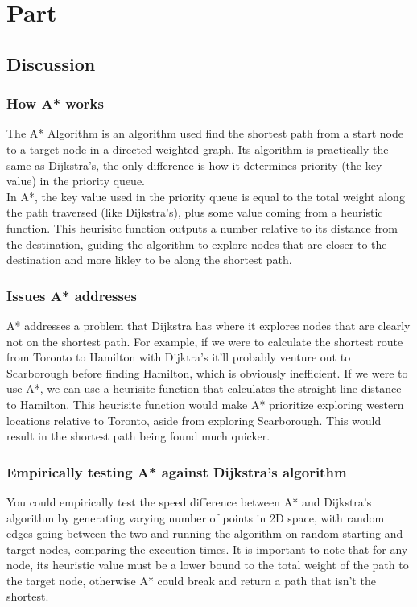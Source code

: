 \documentclass[letterpaper]{article}
\theoremstyle{plain}
\theoremstyle{definition}
\theoremstyle{remark}
\begin{document}
\section*{Part \thesection}

\subsection*{Discussion}

\subsubsection*{How A* works}
The A* Algorithm is an algorithm used find the shortest path from a start node to a target node in a directed weighted graph. Its algorithm is practically the same as Dijkstra's, the only difference is how it determines priority (the key value) in the priority queue.
\\

In A*, the key value used in the priority queue is equal to the total weight along the path traversed (like Dijkstra's), plus some value coming from a heuristic function. This heurisitc function outputs a number relative to its distance from the destination, guiding the algorithm to explore nodes that are closer to the destination and more likley to be along the shortest path.

\subsubsection*{Issues A* addresses}
A* addresses a problem that Dijkstra has where it explores nodes that are clearly not on the shortest path. For example, if we were to calculate the shortest route from Toronto to Hamilton with Dijktra's it'll probably venture out to Scarborough before finding Hamilton, which is obviously inefficient. If we were to use A*, we can use a heurisitc function that calculates the straight line distance to Hamilton. This heurisitc function would make A* prioritize exploring western locations relative to Toronto, aside from exploring Scarborough. This would result in the shortest path being found much quicker.

\subsubsection*{Empirically testing A* against Dijkstra's algorithm}
You could empirically test the speed difference between A* and Dijkstra's algorithm by generating varying number of points in 2D space, with random edges going between the two and running the algorithm on random starting and target nodes, comparing the execution times. It is important to note that for any node, its heuristic value must be a lower bound to the total weight of the path to the target node, otherwise A* could break and return a path that isn't the shortest.
\end{document}
